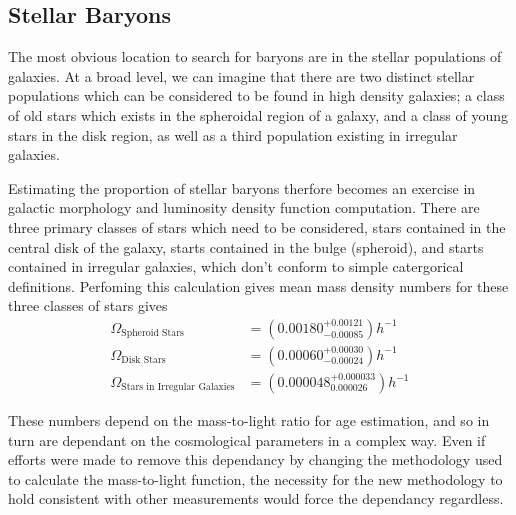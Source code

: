 \subsection{Stellar Baryons}
The most obvious location to search for baryons are in the stellar populations of galaxies. At a broad level, we can imagine that there are two distinct stellar populations which can be considered to be found in high density galaxies; a class of old stars which exists in the spheroidal region of a galaxy, and a class of young stars in the disk region, as well as a third population existing in irregular galaxies.

\par Estimating the proportion of stellar baryons therfore becomes an exercise in galactic morphology and luminosity density function computation. There are three primary classes of stars which need to be considered, stars contained in the central disk of the galaxy, starts contained in the bulge (spheroid), and starts contained in irregular galaxies, which don't conform to simple catergorical definitions. Perfoming this calculation gives mean mass density numbers for these three classes of stars gives
\begin{align*}
\Omega_{\text{Spheroid Stars}} &= (0.00180^{+0.00121}_{-0.00085}) h^{-1} \\
\Omega_{\text{Disk Stars}} &= (0.00060^{+0.00030}_{-0.00024}) h^{-1} \\
\Omega_{\text{Stars in Irregular Galaxies}} &= (0.000048^{+0.000033}_{0.000026}) h^{-1}
\end{align*}

These numbers depend on the mass-to-light ratio for age estimation, and so in turn are dependant on the cosmological parameters in a complex way. Even if efforts were made to remove this dependancy by changing the methodology used to calculate the mass-to-light function, the necessity for the new methodology to hold consistent with other measurements would force the dependancy regardless.

